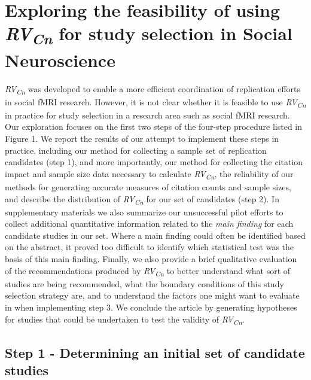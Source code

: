 \documentclass[
  man,floatsintext]{apa6}
\begin{document}
\hypertarget{exploring-the-feasibility-of-using-rvcn-for-study-selection-in-social-neuroscience}{%
\section{\texorpdfstring{Exploring the feasibility of using \emph{RV\textsubscript{Cn}} for study selection in Social Neuroscience}{Exploring the feasibility of using RVCn for study selection in Social Neuroscience}}\label{exploring-the-feasibility-of-using-rvcn-for-study-selection-in-social-neuroscience}}

\emph{RV\textsubscript{Cn}} was developed to enable a more efficient coordination of replication efforts in social fMRI research. However, it is not clear whether it is feasible to use \emph{RV\textsubscript{Cn}} in practice for study selection in a research area such as social fMRI research. Our exploration focuses on the first two steps of the four-step procedure listed in Figure 1. We report the results of our attempt to implement these steps in practice, including our method for collecting a sample set of replication candidates (step 1), and more importantly, our method for collecting the citation impact and sample size data necessary to calculate \emph{RV\textsubscript{Cn}}, the reliability of our methods for generating accurate measures of citation counts and sample sizes, and describe the distribution of \emph{RV\textsubscript{Cn}} for our set of candidates (step 2). In supplementary materials we also summarize our unsuccessful pilot efforts to collect additional quantitative information related to the \emph{main finding} for each candidate studies in our set. Where a main finding could often be identified based on the abstract, it proved too difficult to identify which statistical test was the basis of this main finding. Finally, we also provide a brief qualitative evaluation of the recommendations produced by \emph{RV\textsubscript{Cn}} to better understand what sort of studies are being recommended, what the boundary conditions of this study selection strategy are, and to understand the factors one might want to evaluate in when implementing step 3. We conclude the article by generating hypotheses for studies that could be undertaken to test the validity of \emph{RV\textsubscript{Cn}}.

\hypertarget{step-1---determining-an-initial-set-of-candidate-studies}{%
\subsection{Step 1 - Determining an initial set of candidate studies}\label{step-1---determining-an-initial-set-of-candidate-studies}}
\end{document}
